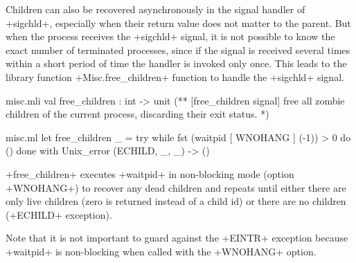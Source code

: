 \begin{example}\label{ex/childs}
Children can also be recovered asynchronously in the signal handler of
\ml+sigchld+, especially when their return value does not matter to
the parent. But when the process receives the \ml+sigchld+ signal, it
is not possible to know the exact number of terminated processes, since if
the signal is received several times within a short period of time the
handler is invoked only once. This leads to the library function
\ml+Misc.free_children+ function to handle the \ml+sigchld+ signal.
%
\begin{codefile}{misc.mli}
val free_children : int -> unit
(** [free_children signal] free all zombie children of the current process, 
    discarding their exit status. *)
\end{codefile}
%
\begin{listingcodefile}{misc.ml}
let free_children _ = 
  try while fst (waitpid [ WNOHANG ] (-1)) > 0 do () done 
  with Unix_error (ECHILD, _, _) -> ()
\end{listingcodefile}
% 
\ml+free_children+ executes \ml+waitpid+ in
non-blocking mode (option \ml+WNOHANG+) to recover any dead children
and repeats until either there are only live children (zero is
returned instead of a child id) or there are no children (\ml+ECHILD+
exception).

Note that it is not important to guard against the \ml+EINTR+
exception because \ml+waitpid+ is non-blocking when called with the
\ml+WNOHANG+ option.
\end{example}

